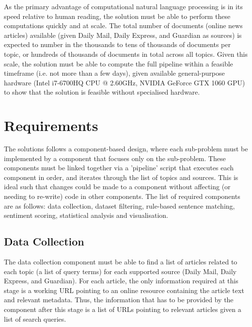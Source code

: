 \documentclass{report}
\begin{document}
As the primary advantage of computational natural language processing is in its speed relative to human reading, the solution must be able to perform these computations quickly and at scale.
The total number of documents (online news articles) available (given Daily Mail, Daily Express, and Guardian as sources) is expected to number in the thousands to tens of thousands of documents per topic, or hundreds of thousands of documents in total across all topics.
Given this scale, the solution must be able to compute the full pipeline within a feasible timeframe (i.e. not more than a few days), given available general-purpose hardware (Intel i7-6700HQ CPU @ 2.60GHz, NVIDIA GeForce GTX 1060 GPU) to show that the solution is feasible without specialised hardware.

\section{Requirements} \label{Requirements}

The solutions follows a component-based design, where each sub-problem must be implemented by a component that focuses only on the sub-problem.
These components must be linked together via a 'pipeline' script that executes each component in order, and iterates through the list of topics and sources.
This is ideal such that changes could be made to a component without affecting (or needing to re-write) code in other components.
The list of required components are as follows: data collection, dataset filtering, rule-based sentence matching, sentiment scoring, statistical analysis and visualisation.


\subsection{Data Collection}  %

The data collection component must be able to find a list of articles related to each topic (a list of query terms) for each supported source (Daily Mail, Daily Express, and Guardian).
For each article, the only information required at this stage is a working URL pointing to an online resource containing the article text and relevant metadata.
Thus, the information that has to be provided by the component after this stage is a list of URLs pointing to relevant articles given a list of search queries.
\end{document}
